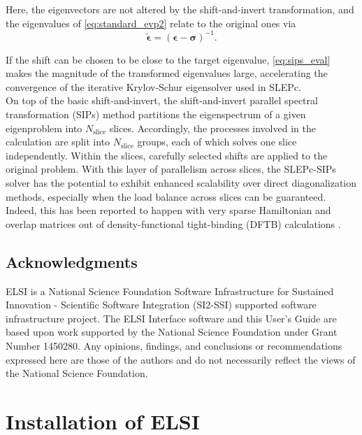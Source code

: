 \documentclass{report}
\begin{document}
\noindent Here, the eigenvectors are not altered by the shift-and-invert transformation, and the eigenvalues of \ref{eq:standard_evp2} relate to the original ones via\\
\begin{equation}
\label{eq:sips_eval}
\boldsymbol{\tilde{\epsilon}} = (\boldsymbol{\epsilon - \sigma})^{-1} .
\end{equation}

If the shift can be chosen to be close to the target eigenvalue, \ref{eq:sips_eval} makes the magnitude of the transformed eigenvalues large, accelerating the convergence of the iterative Krylov-Schur eigensolver used in SLEPc.\\

On top of the basic shift-and-invert, the shift-and-invert parallel spectral transformation (SIPs) method \cite{sips_keceli_2016} partitions the eigenspectrum of a given eigenproblem into $N_\text{slice}$ slices.  Accordingly, the processes involved in the calculation are split into $N_\text{slice}$ groups, each of which solves one slice independently.  Within the slices, carefully selected shifts are applied to the original problem.  With this layer of parallelism across slices, the SLEPc-SIPs solver has the potential to exhibit enhanced scalability over direct diagonalization methods, especially when the load balance across slices can be guaranteed.  Indeed, this has been reported to happen with very sparse Hamiltonian and overlap matrices out of density-functional tight-binding (DFTB) calculations \cite{sips_keceli_2016}.\\

\section{Acknowledgments}
\label{sec:thanks}
ELSI is a National Science Foundation Software Infrastructure for Sustained Innovation - Scientific Software Integration (SI2-SSI) supported software infrastructure project.  The ELSI Interface software and this User's Guide are based upon work supported by the National Science Foundation under Grant Number 1450280.  Any opinions, findings, and conclusions or recommendations expressed here are those of the authors and do not necessarily reflect the views of the National Science Foundation.\\

\chapter{Installation of ELSI}
\end{document}
